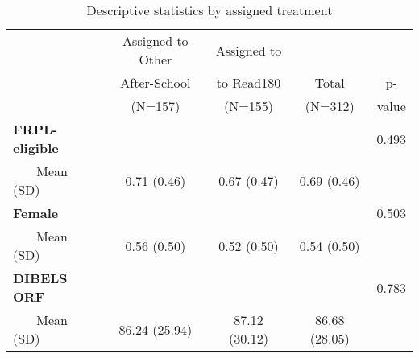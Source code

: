 \begin{table}

\caption{Descriptive statistics by assigned treatment \label{tab:descriptives}}
\centering
\begin{tabular}[t]{lcccc}
\toprule
 & Assigned to Other  & Assigned to &  & \\
 & After-School  & to Read180  & Total& p-\\
 & (N=157) &  (N=155) & (N=312) & value\\
 \midrule
\textbf{FRPL-eligible} &  &  &  & 0.493\\
~~~ Mean (SD) & 0.71 (0.46) & 0.67 (0.47) & 0.69 (0.46) & \\
\textbf{Female} &  &  &  & 0.503\\
~~~ Mean (SD) & 0.56 (0.50) & 0.52 (0.50) & 0.54 (0.50) & \\
\textbf{DIBELS ORF} &  &  &  & 0.783\\
~~~ Mean (SD) & 86.24 (25.94) & 87.12 (30.12) & 86.68 (28.05) & \\
\bottomrule
\end{tabular}
\end{table}

